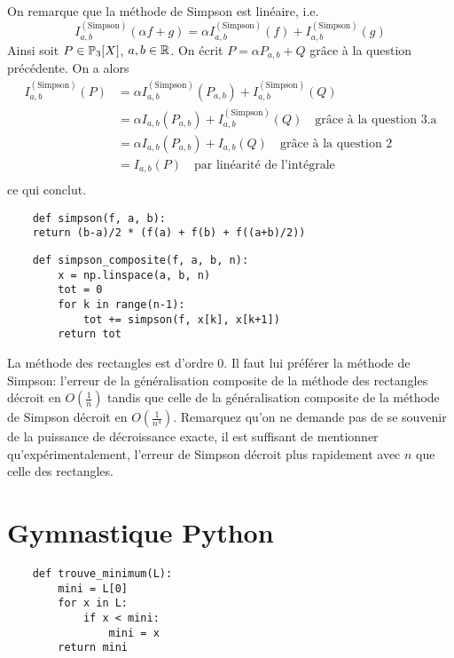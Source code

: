 \ques On remarque que la méthode de Simpson est linéaire, i.e. \[
    I^{(\textrm{Simpson})}_{a, b}(\alpha f + g) = \alpha  I^{(\textrm{Simpson})}_{a, b}(f) +  I^{(\textrm{Simpson})}_{a, b}(g)
\]
Ainsi soit $ P \in \P_3[X] $, $ a, b \in \R $. On écrit $ P = \alpha P_{a, b} + Q $ grâce à la question précédente. On a alors 
\begin{align*}
    I^{(\textrm{Simpson})}_{a, b}(P) &= \alpha  I^{(\textrm{Simpson})}_{a, b}(P_{a,b}) + I^{(\textrm{Simpson})}_{a, b}(Q) \\
                                     &= \alpha I_{a, b}(P_{a, b}) + I^{(\textrm{Simpson})}_{a, b}(Q) \quad \textrm{grâce à la question 3.a}\\
                                     &= \alpha I_{a, b}(P_{a, b}) + I_{a, b}(Q) \quad \textrm{grâce à la question 2}\\
                                     &= I_{a, b}(P) \quad \textrm{par linéarité de l'intégrale}\\
\end{align*}
ce qui conclut.

\ques \begin{verbatim}
    def simpson(f, a, b):
    return (b-a)/2 * (f(a) + f(b) + f((a+b)/2))
\end{verbatim}

\ques \begin{verbatim}
    def simpson_composite(f, a, b, n):
        x = np.linspace(a, b, n)
        tot = 0
        for k in range(n-1):
            tot += simpson(f, x[k], x[k+1])
        return tot
\end{verbatim}

\ques La méthode des rectangles est d'ordre $ 0 $. Il faut lui préférer la méthode de Simpson: l'erreur de la généralisation composite de la méthode des rectangles décroit en $ O(\frac{1}{n}) $ tandis que celle de la généralisation composite de la méthode de Simpson décroit en $ O(\frac{1}{n^4}) $. Remarquez qu'on ne demande pas de se souvenir de la puissance de décroissance exacte, il est suffisant de mentionner qu'expérimentalement, l'erreur de Simpson décroit plus rapidement avec $ n $ que celle des rectangles.


\section*{Gymnastique Python}

\quessques \begin{verbatim}
    def trouve_minimum(L):
        mini = L[0]
        for x in L:
            if x < mini:
                mini = x
        return mini
\end{verbatim}

